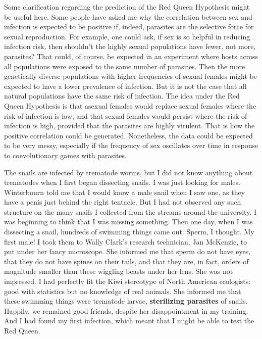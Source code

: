 \documentclass[
  letterpaper,
]{book}
\begin{document}
Some clarification regarding the prediction of the Red Queen Hypothesis
might be useful here. Some people have asked me why the correlation
between sex and infection is expected to be positive if, indeed,
parasites are the selective force for sexual reproduction. For example,
one could ask, if sex is so helpful in reducing infection risk, then
shouldn't the highly sexual populations have fewer, not more, parasites?
That could, of course, be expected in an experiment where hosts across
all populations were exposed to the same number of parasites. Then the
more genetically diverse populations with higher frequencies of sexual
females might be expected to have a lower prevalence of infection. But
it is not the case that all natural populations have the same risk of
infection. The idea under the Red Queen Hypothesis is that asexual
females would replace sexual females where the risk of infection is low,
and that sexual females would persist where the risk of infection is
high, provided that the parasites are highly virulent. That is how the
positive correlation could be generated. Nonetheless, the data could be
expected to be very messy, especially if the frequency of sex oscillates
over time in response to coevolutionary games with parasites.

The snails are infected by trematode worms, but I did not know anything
about trematodes when I first began dissecting snails. I was just
looking for males. Winterbourn told me that I would know a male snail
when I saw one, as they have a penis just behind the right tentacle. But
I had not observed any such structure on the many snails I collected
from the streams around the university. I was beginning to think that I
was missing something. Then one day, when I was dissecting a snail,
hundreds of swimming things came out. Sperm, I thought. My first male! I
took them to Wally Clark's research technician, Jan McKenzie, to put
under her fancy microscope. She informed me that sperm do not have eyes,
that they do not have spines on their tails, and that they are, in fact,
orders of magnitude smaller than these wiggling beasts under her lens.
She was not impressed. I had perfectly fit the Kiwi stereotype of North
American ecologists: good with statistics but no knowledge of real
animals. She informed me that these swimming things were trematode
larvae, \textbf{sterilizing parasites} of snails. Happily, we remained
good friends, despite her disappointment in my training. And I had found
my first infection, which meant that I might be able to test the Red
Queen.
\end{document}
